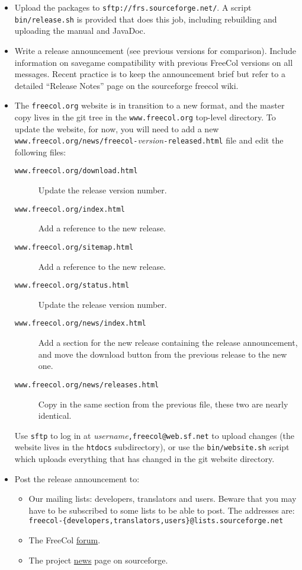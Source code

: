 \documentclass[12pt]{book}
\begin{document}
\begin{itemize}
\item Upload the packages to \verb+sftp://frs.sourceforge.net/+.  A
  script \verb|bin/release.sh| is provided that does this job,
  including rebuilding and uploading the manual and JavaDoc.  

\item Write a release announcement (see previous versions for
  comparison).  Include information on savegame compatibility with
  previous FreeCol versions on all messages.  Recent practice is to
  keep the announcement brief but refer to a detailed ``Release Notes''
  page on the sourceforge freecol wiki.

\item The \texttt{freecol.org} website is in transition to a new
  format, and the master copy lives in the git tree in the
  \texttt{www.freecol.org} top-level directory.  To update the
  website, for now, you will need to add a new
  \texttt{www.freecol.org/news/freecol-}\emph{version}\texttt{-released.html}
  file and edit the following files:
  \begin{description}
  \item[\texttt{www.freecol.org/download.html}] Update the release
    version number.
  \item[\texttt{www.freecol.org/index.html}] Add a reference to the
    new release.
  \item[\texttt{www.freecol.org/sitemap.html}] Add a reference to the
    new release.
  \item[\texttt{www.freecol.org/status.html}] Update the release
    version number.
  \item[\texttt{www.freecol.org/news/index.html}] Add a section for
    the new release containing the release announcement, and move the
    download button from the previous release to the new one.
  \item[\texttt{www.freecol.org/news/releases.html}] Copy in the same
    section from the previous file, these two are nearly identical.
  \end{description}
  Use \texttt{sftp} to log in at
  \emph{username}\texttt{,freecol@web.sf.net} to upload changes (the
  website lives in the \texttt{htdocs} subdirectory), or use the
  \verb|bin/website.sh| script which uploads everything that has
  changed in the git website directory.

\item Post the release announcement to:
  \begin{itemize}
    \item Our mailing lists: developers, translators and users.
      Beware that you may have to be subscribed to some lists to be
      able to post.  The addresses are:
      \texttt{freecol-\{developers,translators,users\}@lists.sourceforge.net}
    \item The FreeCol
      \href{https://sourceforge.net/p/freecol/discussion/141200/}{forum}.
    \item The project
      \href{https://sourceforge.net/p/freecol/news/}{news} page on sourceforge.
  \end{itemize}


\end{itemize}
\end{document}
